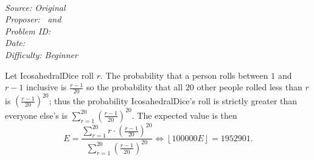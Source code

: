 \SSbreak\\
\emph{Source: Original}\\
\emph{Proposer: \Ptan\, and \Pwen}\\
\emph{Problem ID:}\\
\emph{Date: }\\
\emph{Difficulty: Beginner}\\
\SSbreak

\bigskip

\begin{solution}\hfil\medskip
  
    Let IcosahedralDice roll $r$. The probability that a person rolls between $1$ and $r - 1$ inclusive is $\frac{r - 1}{20}$ so the probability that all $20$
    other people rolled less than $r$ is $\left(\frac{r - 1}{20}\right)^{20}$; thus the probability IcosahedralDice's roll is strictly greater than everyone else's
    is $\sum_{r = 1}^{20} \left(\frac{r - 1}{20}\right)^{20}$. The expected value is then
    $$E = \dfrac{\sum_{r = 1}^{20} r \cdot \left(\frac{r - 1}{20}\right)^{20}}{\sum_{r = 1}^{20} \left(\frac{r - 1}{20}\right)^{20}} \iff \left\lfloor 100000E \right\rfloor = \boxed{1952901}.$$
\end{solution}\bigskip
